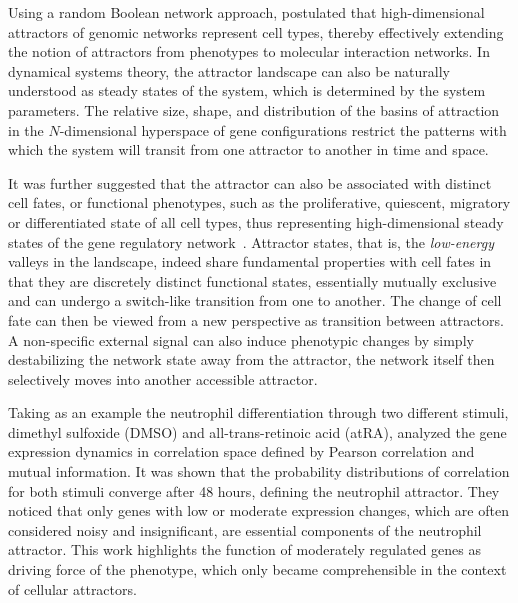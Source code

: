 Using a random Boolean network approach, \cite{Kauffman1969a} postulated that high-dimensional attractors of genomic networks represent cell types, thereby effectively
extending the notion of attractors from phenotypes to molecular interaction
networks.
In dynamical systems theory, the attractor landscape can also be naturally 
understood as steady states of the system, which is determined by the system 
parameters.
The relative size, shape, and distribution of the basins of
attraction in the $N$-dimensional hyperspace of gene configurations restrict the patterns with which the system will
transit from one attractor to another in time and space.

It was further suggested that the attractor can also be associated with distinct cell fates, or functional phenotypes, such as the proliferative, quiescent, migratory or differentiated state of all cell types, thus representing high-dimensional 
steady states of the gene regulatory network~\citep{Huang2006,Huang2005}.
Attractor states, that is, the \emph{low-energy} valleys in the landscape, indeed share fundamental properties with cell fates in that they are discretely distinct functional states, essentially mutually exclusive and can undergo a switch-like transition from one to another. The change of cell fate can then be viewed from a new
perspective as transition between
attractors. A non-specific external signal can also induce phenotypic changes by
simply destabilizing the network state 
away from the attractor, the network itself then selectively moves into another
accessible attractor.

Taking as an example the neutrophil differentiation through two different stimuli, dimethyl sulfoxide (DMSO) and all-trans-retinoic acid (atRA), \cite{Tsuchiya2010}
analyzed the gene expression dynamics in correlation space defined by Pearson correlation and mutual information. It was shown that the probability distributions of
correlation for both stimuli converge after 48 hours, defining the neutrophil attractor. They noticed that only genes with low or moderate expression changes, which are often considered noisy and insignificant, are essential components of the neutrophil attractor. This work highlights the function of moderately regulated genes as 
driving force of the phenotype, which only became comprehensible in the context
of cellular attractors.

